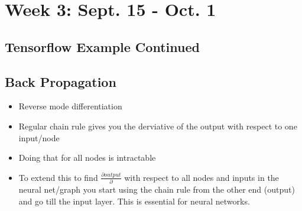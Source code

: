 \chapter{Week 3: Sept. 15 - Oct. 1}
\label{week:3}
\section{Tensorflow Example Continued}


\section{Back Propagation}
\begin{itemize}
	\item Reverse mode differentiation
	\item Regular chain rule gives you the derviative of the output with respect to one input/node
	\item Doing that for all nodes is intractable
	\item To extend this to find $\frac{\partial output}{\partial}$ with respect to all nodes and inputs in the neural net/graph you start using the chain rule from the other end (output) and go till the input layer. This is essential for neural networks. \cite{backprop}
\end{itemize}